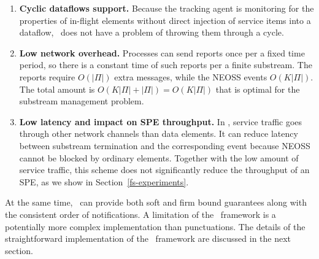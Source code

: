 \begin{enumerate}
    \item {\bf Cyclic dataflows support.} Because the tracking agent is monitoring for the properties of in-flight elements without direct injection of service items into a dataflow, \tracker\ does not have a problem of throwing them through a cycle.
    \item {\bf Low network overhead.} Processes can send reports once per a fixed time period, so there is a constant time of such reports per a finite substream. The reports require $O(|\Pi|)$ extra messages, while the NEOSS events $O(K|\Pi|)$. The total amount is $O(K|\Pi| + |\Pi|) = O(K|\Pi|)$ that is optimal for the substream management problem. 
    \item {\bf Low latency and impact on SPE throughput.} In \tracker, service traffic goes through other network channels than data elements. It can reduce latency between substream termination and the corresponding event because NEOSS cannot be blocked by ordinary elements. Together with the low amount of service traffic, this scheme does not significantly reduce the throughput of an SPE, as we show in Section~\ref{fs-experiments}.
\end{enumerate}

At the same time, \tracker\ can provide both soft and firm bound guarantees along with the consistent order of notifications. A limitation of the \tracker\ framework is a potentially more complex implementation than punctuations. The details of the straightforward implementation of the \tracker\ framework are discussed in the next section.